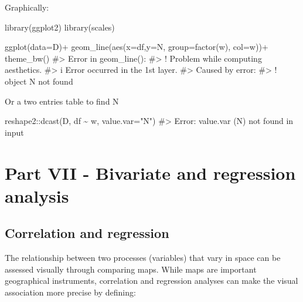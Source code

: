 \documentclass[
  letterpaper,
  DIV=11,
  numbers=noendperiod]{scrreprt}
\newenvironment{Shaded}{\begin{snugshade}}{\end{snugshade}}
\newcommand{\AttributeTok}[1]{\textcolor[rgb]{0.40,0.45,0.13}{#1}}
\newcommand{\CommentTok}[1]{\textcolor[rgb]{0.37,0.37,0.37}{#1}}
\newcommand{\FunctionTok}[1]{\textcolor[rgb]{0.28,0.35,0.67}{#1}}
\newcommand{\NormalTok}[1]{\textcolor[rgb]{0.00,0.23,0.31}{#1}}
\newcommand{\SpecialCharTok}[1]{\textcolor[rgb]{0.37,0.37,0.37}{#1}}
\newcommand{\StringTok}[1]{\textcolor[rgb]{0.13,0.47,0.30}{#1}}
\begin{document}
Graphically:

\begin{Shaded}
\begin{Highlighting}[]
\FunctionTok{library}\NormalTok{(ggplot2)}
\FunctionTok{library}\NormalTok{(scales)}

\FunctionTok{ggplot}\NormalTok{(}\AttributeTok{data=}\NormalTok{D)}\SpecialCharTok{+}
  \FunctionTok{geom\_line}\NormalTok{(}\FunctionTok{aes}\NormalTok{(}\AttributeTok{x=}\NormalTok{df,}\AttributeTok{y=}\NormalTok{N, }\AttributeTok{group=}\FunctionTok{factor}\NormalTok{(w), }\AttributeTok{col=}\NormalTok{w))}\SpecialCharTok{+}
  \FunctionTok{theme\_bw}\NormalTok{()}
\CommentTok{\#\textgreater{} Error in \textasciigrave{}geom\_line()\textasciigrave{}:}
\CommentTok{\#\textgreater{} ! Problem while computing aesthetics.}
\CommentTok{\#\textgreater{} i Error occurred in the 1st layer.}
\CommentTok{\#\textgreater{} Caused by error:}
\CommentTok{\#\textgreater{} ! object \textquotesingle{}N\textquotesingle{} not found}
\end{Highlighting}
\end{Shaded}

Or a two entries table to find N

\begin{Shaded}
\begin{Highlighting}[]
\NormalTok{reshape2}\SpecialCharTok{::}\FunctionTok{dcast}\NormalTok{(D, df }\SpecialCharTok{\textasciitilde{}}\NormalTok{ w, }\AttributeTok{value.var=}\StringTok{"N"}\NormalTok{)}
\CommentTok{\#\textgreater{} Error: value.var (N) not found in input}
\end{Highlighting}
\end{Shaded}

\part{Part VII - Bivariate and regression analysis}

\chapter{Correlation and regression}\label{correlation-and-regression}

The relationship between two processes (variables) that vary in space
can be assessed visually through comparing maps. While maps are
important geographical instruments, correlation and regression analyses
can make the visual association more precise by defining:
\end{document}
